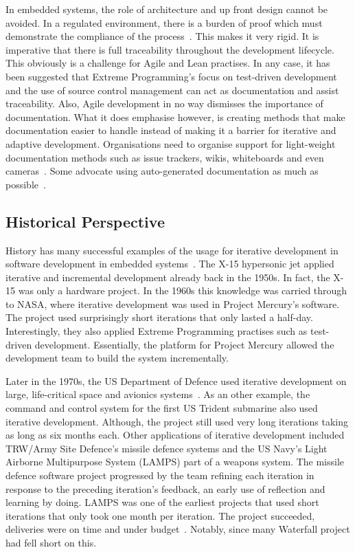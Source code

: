 \documentclass[english]{tktltiki2}
\begin{document}
In embedded systems, the role of architecture and up front design cannot be avoided. In a regulated environment, there is a burden of proof which must demonstrate the compliance of the process~\cite{CWR10}. This makes it very rigid. It is imperative that there is full traceability throughout the development lifecycle. This obviously is a challenge for Agile and Lean practises. In any case, it has been suggested that Extreme Programming’s focus on test-driven development and the use of source control management can act as documentation and assist traceability. Also, Agile development in no way dismisses the importance of documentation. What it does emphasise however, is creating methods that make documentation easier to handle instead of making it a barrier for iterative and adaptive development. Organisations need to organise support for light-weight documentation methods such as issue trackers, wikis, whiteboards and even cameras~\cite{HMP12}. Some advocate using auto-generated documentation as much as possible~\cite{VB09, JLP12}.

\subsection{Historical Perspective}

History has many successful examples of the usage for iterative development in software development in embedded systems~\cite{LB03}. The X-15 hypersonic jet applied iterative and incremental development already back in the 1950s. In fact, the X-15 was only a hardware project. In the 1960s this knowledge was carried through to NASA, where iterative development was used in Project Mercury’s software. The project used surprisingly short iterations that only lasted a half-day. Interestingly, they also applied Extreme Programming practises such as test-driven development. Essentially, the platform for Project Mercury allowed the development team to build the system incrementally.

Later in the 1970s, the US Department of Defence used iterative development on large, life-critical space and avionics systems~\cite{LB03}. As an other example, the command and control system for the first US Trident submarine also used iterative development. Although, the project still used very long iterations taking as long as six months each. Other applications of iterative development included TRW/Army Site Defence’s missile defence systems and the US Navy’s Light Airborne Multipurpose System (LAMPS) part of a weapons system. The missile defence software project progressed by the team refining each iteration in response to the preceding iteration’s feedback, an early use of reflection and learning by doing. LAMPS was one of the earliest projects that used short iterations that only took one month per iteration. The project succeeded, deliveries were on time and under budget~\cite{LB03}. Notably, since many Waterfall project had fell short on this.
\end{document}
